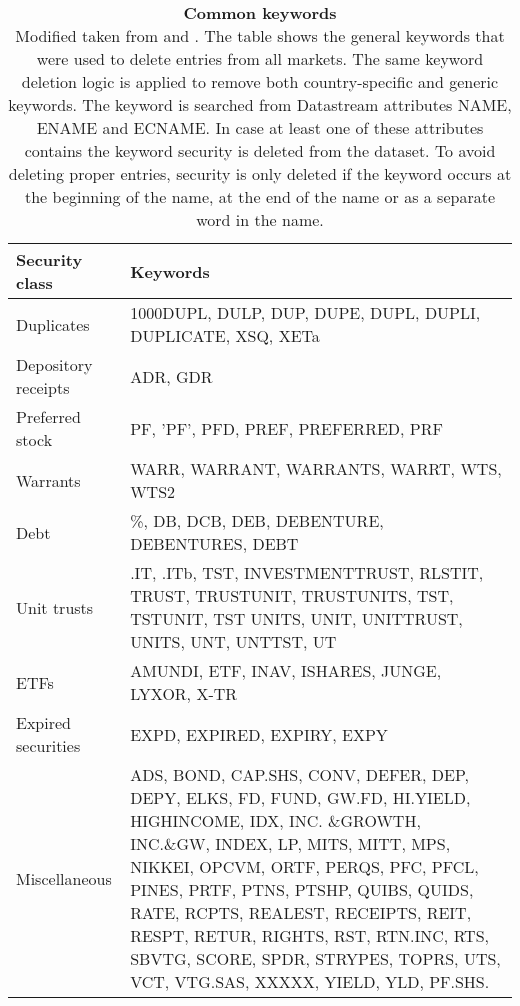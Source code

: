 \documentclass[12pt]{article}
\begin{document}
\begin{appendices}
\begin{table}[H] 
\footnotesize
\caption[Common keywords]{\textbf{Common keywords}\\ Modified taken from \protect\citet{Ince2006} and \protect\citet{HANAUER2023106712}. The table shows the general keywords that were used to delete entries from all markets. The same keyword deletion logic is applied to remove both country-specific and generic keywords. The keyword is searched from Datastream attributes NAME, ENAME and ECNAME. In case at least one of these attributes contains the keyword security is deleted from the dataset. To avoid deleting proper entries, security is only deleted if the keyword occurs at the beginning of the name, at the end of the name or as a separate word in the name.}
 \label{table:GeneralKeywords}
\centering
\begin{tabularx}{\textwidth}{l X}
\toprule
Security class 	& Keywords \\
\midrule
Duplicates 		& 1000DUPL, DULP, DUP, DUPE, DUPL, DUPLI, DUPLICATE, XSQ, XETa  \\[1ex]
Depository receipts	& ADR, GDR \\[1ex]
Preferred stock 	&  PF, ’PF’, PFD, PREF, PREFERRED, PRF\\ [1ex]
Warrants 			&  WARR, WARRANT, WARRANTS, WARRT, WTS, WTS2\\[1ex]
Debt 			& \%, DB, DCB, DEB, DEBENTURE, DEBENTURES, DEBT\\[1ex]
Unit trusts 		& .IT, .ITb, TST, INVESTMENTTRUST, RLSTIT, TRUST, TRUSTUNIT, TRUSTUNITS, TST, TSTUNIT, TST UNITS, UNIT, UNITTRUST, UNITS, UNT, UNTTST, UT\\[1ex]
ETFs 			& AMUNDI, ETF, INAV, ISHARES, JUNGE, LYXOR, X-TR\\[1ex]
Expired securities 	& EXPD, EXPIRED, EXPIRY, EXPY\\[1ex]
Miscellaneous 		& ADS, BOND, CAP.SHS, CONV, DEFER, DEP, DEPY, ELKS, FD, FUND, GW.FD, HI.YIELD, HIGHINCOME, IDX, INC.								\&GROWTH, INC.\&GW, INDEX, LP, MITS, MITT, MPS, NIKKEI, OPCVM, ORTF, PERQS, 												PFC, PFCL, PINES, PRTF, PTNS, PTSHP, QUIBS, QUIDS, RATE, RCPTS, REALEST, RECEIPTS, REIT, RESPT, 								RETUR, RIGHTS, RST, RTN.INC, RTS, SBVTG, SCORE, SPDR, STRYPES, TOPRS, UTS, VCT, VTG.SAS, 									XXXXX, YIELD, YLD, PF.SHS.\\
 \bottomrule
 \end{tabularx}
 \end{table} 
 

\end{appendices}
\end{document}
